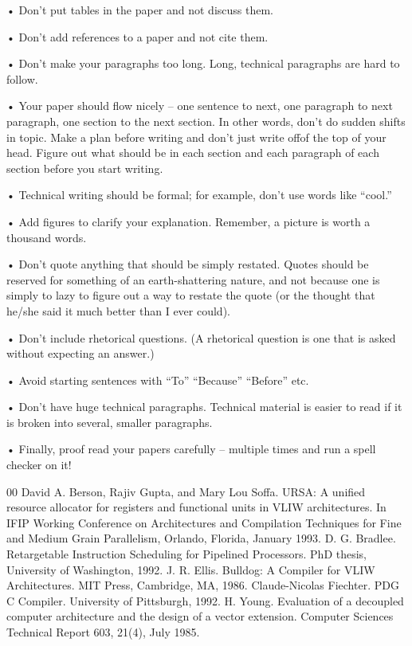 \documentclass[conference]{IEEEtran}
\begin{document}
• Don't put tables in the paper and not discuss them.

• Don't add references to a paper and not cite them.

• Don't make your paragraphs too long. Long, technical paragraphs are hard to follow.

• Your paper should flow nicely -- one sentence to next, one paragraph to next paragraph, one section to the next section. In other words, don't do sudden shifts in topic. Make a plan before writing and don't just write offof the top of your head. Figure out what should be in each section and each paragraph of each section before you start writing.

• Technical writing should be formal; for example, don't use words like ``cool.''

• Add figures to clarify your explanation. Remember, a picture is worth a thousand words.

• Don't quote anything that should be simply restated. Quotes should be reserved for something of an earth-shattering nature, and not because one is simply to lazy to figure out a way to restate the quote (or the thought that he/she said it much better than I ever could).

• Don't include rhetorical questions. (A rhetorical question is one that is asked without expecting an answer.)

• Avoid starting sentences with ``To'' ``Because'' ``Before'' etc.

• Don't have huge technical paragraphs. Technical material is easier to read if it is broken into several, smaller paragraphs.

• Finally, proof read your papers carefully -- multiple times and run a spell checker on it!

\begin{thebibliography}{00}
 David A. Berson, Rajiv Gupta, and Mary Lou Soffa. URSA: A unified resource allocator for registers and functional units in VLIW architectures. In IFIP Working Conference on Architectures and Compilation Techniques for Fine and Medium Grain Parallelism, Orlando, Florida, January 1993.
 D. G. Bradlee. Retargetable Instruction Scheduling for Pipelined Processors. PhD thesis, University of Washington, 1992.
 J. R. Ellis. Bulldog: A Compiler for VLIW Architectures. MIT Press, Cambridge, MA, 1986.
 Claude-Nicolas Fiechter. PDG C Compiler. University of Pittsburgh, 1992.
 H. Young.
Evaluation of a decoupled computer architecture and the design of a vector extension. Computer Sciences Technical Report 603, 21(4), July 1985.
\end{thebibliography}
\end{document}
